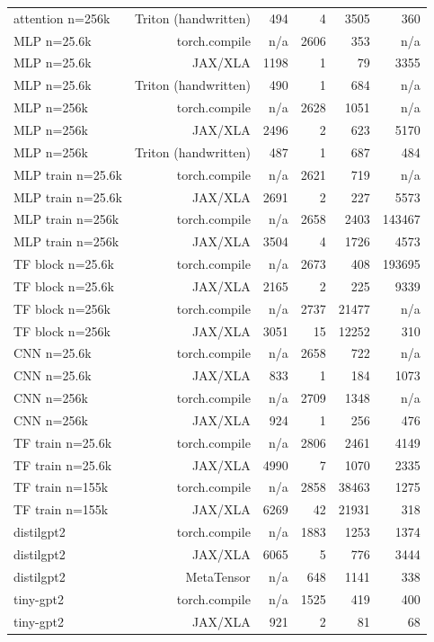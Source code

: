\begin{tabular}{lrrrrr}
attention n=256k & Triton (handwritten) & 494 & 4 & 3505 & 360 \\
MLP n=25.6k & torch.compile & n/a & 2606 & 353 & n/a \\
MLP n=25.6k & JAX/XLA & 1198 & 1 & 79 & 3355 \\
MLP n=25.6k & Triton (handwritten) & 490 & 1 & 684 & n/a \\
MLP n=256k & torch.compile & n/a & 2628 & 1051 & n/a \\
MLP n=256k & JAX/XLA & 2496 & 2 & 623 & 5170 \\
MLP n=256k & Triton (handwritten) & 487 & 1 & 687 & 484 \\
MLP train n=25.6k & torch.compile & n/a & 2621 & 719 & n/a \\
MLP train n=25.6k & JAX/XLA & 2691 & 2 & 227 & 5573 \\
MLP train n=256k & torch.compile & n/a & 2658 & 2403 & 143467 \\
MLP train n=256k & JAX/XLA & 3504 & 4 & 1726 & 4573 \\
TF block n=25.6k & torch.compile & n/a & 2673 & 408 & 193695 \\
TF block n=25.6k & JAX/XLA & 2165 & 2 & 225 & 9339 \\
TF block n=256k & torch.compile & n/a & 2737 & 21477 & n/a \\
TF block n=256k & JAX/XLA & 3051 & 15 & 12252 & 310 \\
CNN n=25.6k & torch.compile & n/a & 2658 & 722 & n/a \\
CNN n=25.6k & JAX/XLA & 833 & 1 & 184 & 1073 \\
CNN n=256k & torch.compile & n/a & 2709 & 1348 & n/a \\
CNN n=256k & JAX/XLA & 924 & 1 & 256 & 476 \\
TF train n=25.6k & torch.compile & n/a & 2806 & 2461 & 4149 \\
TF train n=25.6k & JAX/XLA & 4990 & 7 & 1070 & 2335 \\
TF train n=155k & torch.compile & n/a & 2858 & 38463 & 1275 \\
TF train n=155k & JAX/XLA & 6269 & 42 & 21931 & 318 \\
distilgpt2 & torch.compile & n/a & 1883 & 1253 & 1374 \\
distilgpt2 & JAX/XLA & 6065 & 5 & 776 & 3444 \\
distilgpt2 & MetaTensor & n/a & 648 & 1141 & 338 \\
tiny-gpt2 & torch.compile & n/a & 1525 & 419 & 400 \\
tiny-gpt2 & JAX/XLA & 921 & 2 & 81 & 68 \\

\end{tabular}
